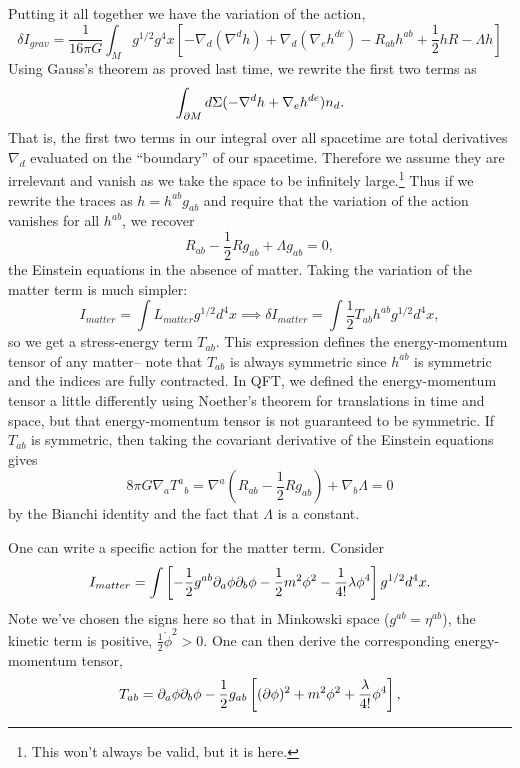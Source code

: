 Putting it all together we have the variation of the action,
$$
\delta I_{grav}=\frac{1}{16\pi G} \int_M g^{1/2} g^4 x \left[-\nabla_d (\nabla^d h) +\nabla_d (\nabla_e h^{de}) - R_{ab} h^{ab} +\frac{1}{2} h R - \Lambda h\right]$$
Using Gauss's theorem as proved last time, we rewrite the first two terms as
$$\int_{\partial M}d \Sigma (-\nabla^d h + \nabla_e h^{de})n_d.$$
That is, the first two terms in our integral over all spacetime are total derivatives $\nabla_d$ evaluated on the ``boundary'' of our spacetime. Therefore we assume they are irrelevant and vanish as we take the space to be infinitely large.\footnote{This won't always be valid, but it is here.} Thus if we rewrite the traces as $h=h^{ab}g_{ab}$ and require that the variation of the action vanishes for all $h^{ab}$, we recover
$$R_{ab}-\frac{1}{2}R g_{ab}+\Lambda g_{ab}=0,$$
the Einstein equations in the absence of matter. Taking the variation of the matter term is much simpler:
$$I_{matter}=\int L_{matter} g^{1/2}d^4x \implies \delta I_{matter}= \int \frac{1}{2} T_{ab} h^{ab} g^{1/2} d^4x,$$
so we get a stress-energy term $T_{ab}$. This expression defines the energy-momentum tensor of any matter-- note that $T_{ab}$ is always symmetric since $h^{ab}$ is symmetric and the indices are fully contracted. In QFT, we defined the energy-momentum tensor a little differently using Noether's theorem for translations in time and space, but that energy-momentum tensor is not guaranteed to be symmetric. If $T_{ab}$ is symmetric, then taking the covariant derivative of the Einstein equations gives
$$8\pi G \nabla_a T^a{}_b= \nabla^a(R_{ab}-\frac{1}{2} R g_{ab})+\nabla_b \Lambda = 0$$
by the Bianchi identity and the fact that $\Lambda$ is a constant.

\begin{exm}
One can write a specific action for the matter term. Consider
$$I_{matter}=\int \left[-\frac{1}{2} g^{ab}\partial_a \phi \partial_b \phi-\frac{1}{2} m^2 \phi^2 -\frac{1}{4!} \lambda \phi^4 \right] g^{1/2} d^4x.$$
Note we've chosen the signs here so that in Minkowski space ($g^{ab}=\eta^{ab}$), the kinetic term is positive, $\frac{1}{2} \dot \phi^2 >0.$ One can then derive the corresponding energy-momentum tensor,
$$T_{ab}=\partial_a \phi \partial_b \phi -\frac{1}{2} g_{ab} \left[(\partial\phi)^2+m^2\phi^2+\frac{\lambda}{4!}\phi^4\right],$$
\end{exm}